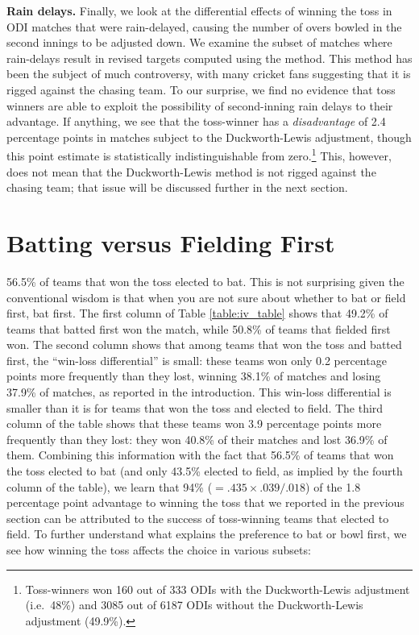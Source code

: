 \documentclass[11pt,  letterpaper]{article}
\begin{document}
\textbf{Rain delays.} Finally, we look at the differential effects of winning the toss in ODI matches that were rain-delayed, causing the number of overs bowled in the second innings to be adjusted down. We examine the subset of matches where rain-delays result in revised targets computed using the \citet{duckworth1998} method. This method has been the subject of much controversy, with many cricket fans suggesting that it is rigged against the chasing team. To our surprise, we find no evidence that toss winners are able to exploit the possibility of second-inning rain delays to their advantage. If anything, we see that the toss-winner has a \emph{disadvantage} of 2.4 percentage points in matches subject to the Duckworth-Lewis adjustment, though this point estimate is statistically indistinguishable from zero.\footnote{Toss-winners won 160 out of 333 ODIs with the Duckworth-Lewis adjustment (i.e.~48\%) and 3085 out of 6187 ODIs without the Duckworth-Lewis adjustment (49.9\%).} This, however, does not mean that the Duckworth-Lewis method is not rigged against the chasing team; that issue will be discussed further in the next section.




\section{Batting versus Fielding First}

56.5\% of teams that won the toss elected to bat. This is not surprising given the conventional wisdom is that when you are not sure about whether to bat or field first, bat first. The first column of Table \ref{table:iv_table} shows that 49.2\% of teams that batted first won the match, while 50.8\% of teams that fielded first won. The second column shows that among teams that won the toss and batted first, the ``win-loss differential'' is small: these teams won only 0.2 percentage points more frequently than they lost, winning 38.1\% of matches and losing 37.9\% of matches, as reported in the introduction. This win-loss differential is smaller than it is for teams that won the toss and elected to field. The third column of the table shows that these teams won 3.9 percentage points more frequently than they lost: they won 40.8\% of their matches and lost 36.9\% of them. Combining this information with the fact that 56.5\% of teams that won the toss elected to bat (and only 43.5\% elected to field, as implied by the fourth column of the table), we learn that 94\% ($= .435 \times .039/.018$) of the 1.8 percentage point advantage to winning the toss that we reported in the previous section can be attributed to the success of toss-winning teams that elected to field. To further understand what explains the preference to bat or bowl first, we see how winning the toss affects the choice in various subsets:
\end{document}
